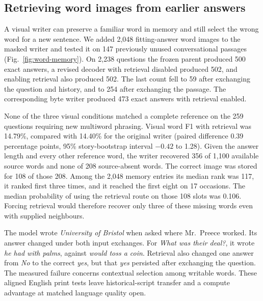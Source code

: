 \subsection*{Retrieving word images from earlier answers}
A visual writer can preserve a familiar word in memory and still select the wrong word for a new sentence. We added 2,048 fitting-answer word images to the masked writer and tested it on 147 previously unused conversational passages (Fig.~\ref{fig:word-memory}). On 2,238 questions the frozen parent produced 500 exact answers, a revised decoder with retrieval disabled produced 502, and enabling retrieval also produced 502. The last count fell to 59 after exchanging the question and history, and to 254 after exchanging the passage. The corresponding byte writer produced 473 exact answers with retrieval enabled.

None of the three visual conditions matched a complete reference on the 259 questions requiring new multiword phrasing. Visual word F1 with retrieval was 14.79\%, compared with 14.40\% for the original writer (paired difference 0.39 percentage points, 95\% story-bootstrap interval $-0.42$ to 1.28). Given the answer length and every other reference word, the writer recovered 356 of 1,100 available source words and none of 208 source-absent words. The correct image was stored for 108 of those 208. Among the 2,048 memory entries its median rank was 117, it ranked first three times, and it reached the first eight on 17 occasions. The median probability of using the retrieval route on those 108 slots was 0.106. Forcing retrieval would therefore recover only three of these missing words even with supplied neighbours.

The model wrote \emph{University of Bristol} when asked where Mr.\ Preece worked. Its answer changed under both input exchanges. For \emph{What was their deal?}, it wrote \emph{he had with palms}, against \emph{would toss a coin}. Retrieval also changed one answer from \emph{No} to the correct \emph{yes}, but that \emph{yes} persisted after exchanging the question. The measured failure concerns contextual selection among writable words. These aligned English print tests leave historical-script transfer and a compute advantage at matched language quality open.

